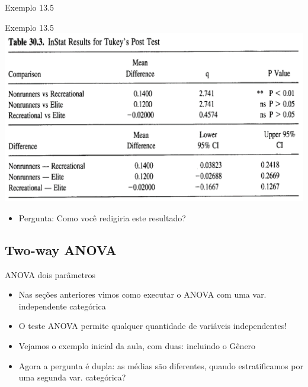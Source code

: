 \documentclass{beamer}
\begin{document}
\begin{frame}{\small Exemplo 13.5}
  \begin{exampleblock}{Exemplo 13.5}
    \includegraphics[width=\textwidth]{Cap13-30/exemplo13_5-4}
    \begin{itemize}
    \item Pergunta: Como você redigiria este resultado?
    \end{itemize}
  \end{exampleblock}
\end{frame}

\subsection{Two-way ANOVA}

\begin{frame}{ANOVA dois parâmetros}
  \begin{itemize}
  \item Nas seções anteriores vimos como executar o ANOVA com uma var. independente categórica
  \item O teste ANOVA permite qualquer quantidade de variáveis independentes!
  \item Vejamos o exemplo inicial da aula, com duas: incluindo o Gênero
  \item Agora a pergunta é dupla: as médias são diferentes, quando estratificamos por uma segunda var. categórica?
  \end{itemize}
\end{frame}
\end{document}

